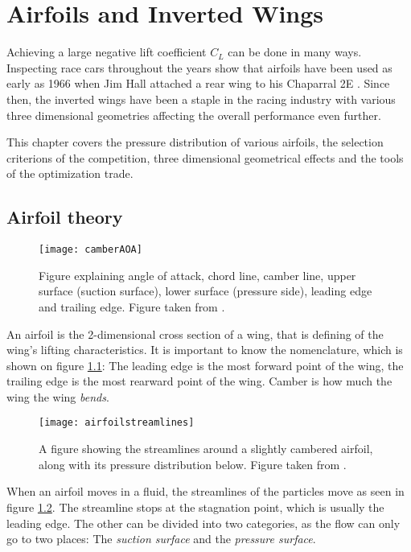 \chapter{Airfoils and Inverted Wings}

Achieving a large negative lift coefficient $C_L$ can be done in many ways. Inspecting race cars throughout the years show that airfoils have been used as early as 1966 when Jim Hall attached a rear wing to his Chaparral 2E \cite{hucho}. Since then, the inverted wings have been a staple in the racing industry with various three dimensional geometries affecting the overall performance even further.

This chapter covers the pressure distribution of various airfoils, the selection criterions of the competition, three dimensional geometrical effects and the tools of the optimization trade.

\section{Airfoil theory}

  \begin{figure}
    \texttt{[image: camberAOA]}
    \caption{Figure explaining angle of attack, chord line, camber line, upper surface (suction surface), lower surface (pressure side), leading edge and trailing edge. Figure taken from \cite{wikicamberAOA}.}
    \label{fig:camberAOA}
  \end{figure}

  An airfoil is the 2-dimensional cross section of a wing, that is defining of the wing's lifting characteristics. It is important to know the nomenclature, which is shown on figure \ref{fig:camberAOA}: The leading edge is  the most forward point of the wing, the trailing edge is the most rearward point of the wing. Camber is how much the wing the wing \emph{bends}.

  \begin{figure}
    \texttt{[image: airfoilstreamlines]}
    \caption{A figure showing the streamlines around a slightly cambered airfoil, along with its pressure distribution below. Figure taken from \cite{jkatz}.}
    \label{fig:airfoilstreamlines}
  \end{figure}

  When an airfoil moves in a fluid, the streamlines of the particles move as seen in figure \ref{fig:airfoilstreamlines}. The streamline stops at the stagnation point, which is usually the leading edge. The other can be divided into two categories, as the flow can only go to two places: The \emph{suction surface} and the \emph{pressure surface}.

